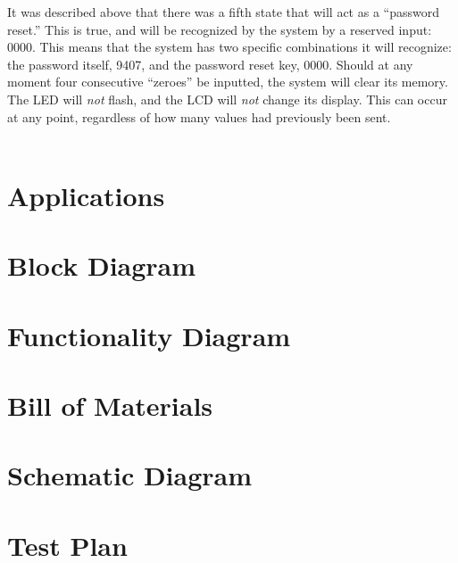 \documentclass[10pt,a4paper]{article}
\begin{document}
\pagebreak
It was described above that there was a fifth state that will act as a ``password reset.'' This is true, and will be recognized by the system by a reserved input: 0000. This means that the system has two specific combinations it will recognize: the password itself, 9407, and the password reset key, 0000. Should at any moment four consecutive ``zeroes'' be inputted, the system will clear its memory. The LED will \textit{not} flash, and the LCD will \textit{not} change its display. This can occur at any point, regardless of how many values had previously been sent.\\~\\
\pagebreak
\section{Applications}
\pagebreak
\section{Block Diagram}
\pagebreak
\section{Functionality Diagram}
\pagebreak
\section{Bill of Materials}
\pagebreak
\section{Schematic Diagram}
\pagebreak
\section{Test Plan}
\end{document}
